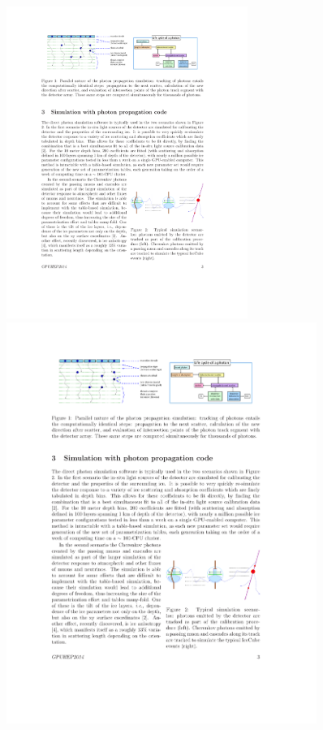 \begin{figure}[htbp]
  \hspace{1.5cm}
  \includegraphics[width=0.7\textwidth, trim={7.7cm 0 0 0}, clip]{img/dima-parallel-photons-Id3ioyie}
  \newline\hspace*{1.5cm}
  \includegraphics[width=0.9\textwidth, trim={0 0 6.2cm 0}, clip]{img/dima-parallel-photons-Id3ioyie}

\end{figure}
